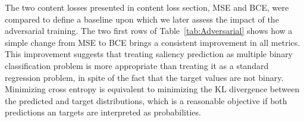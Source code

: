 \documentclass[times,twocolumn,final,authoryear]{elsarticle}
\begin{document}
The two content losses presented in content loss section, MSE and BCE, were compared to define a baseline upon which we later assess the impact of the adversarial training.
The two first rows of Table~\ref{tab:Adversarial} shows how a simple change from MSE to BCE brings a consistent improvement in all metrics. This improvement suggests that treating saliency prediction as multiple binary classification problem is more appropriate than treating it as a standard regression problem, in spite of the fact that the target values are not binary. Minimizing cross entropy is equivalent to minimizing the KL divergence between the predicted and target distributions, which is a reasonable objective if both predictions an targets are interpreted as probabilities.

\end{document}
